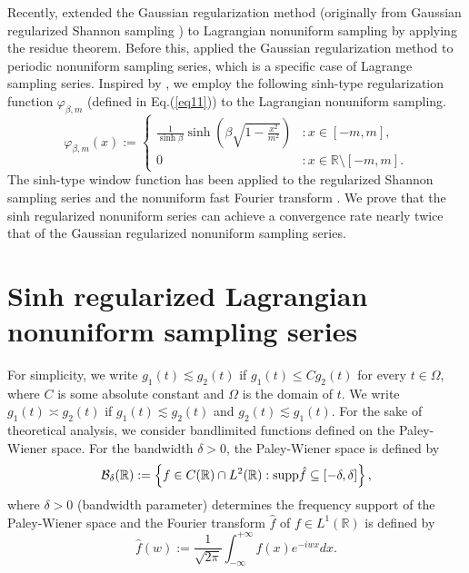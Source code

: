 \documentclass[a4paper]{article}
\numberwithin{equation}{section}
\begin{document}
Recently, \cite{yang2025exponential} extended the Gaussian regularization method (originally from Gaussian regularized Shannon sampling \cite{Wei1998,Wei2000,Qian2003,Tanaka2008,Micchelli2009,Lin2017,chen2019sharp,lin2019optimal,asharabi2022multidimensional,chen2023hyper}) to Lagrangian nonuniform sampling by applying the residue theorem. Before this, \cite{asharabi2023periodic,asharabi2024modification}   applied the Gaussian regularization method to periodic nonuniform sampling series, which is a specific case of Lagrange sampling series. Inspired by \cite{kircheis2024optimal}, we employ the 
following sinh-type regularization function $\varphi_{\beta,m}$ (defined in Eq.(\ref{eq11})) to the Lagrangian nonuniform sampling.
\begin{equation}\label{eq11} 
\varphi_{\beta,m}(x) := 
\begin{cases} 
\frac{1}{\sinh \beta} \sinh \left( \beta \sqrt{1 - \frac{x^2}{m^2}} \right) & : x \in [-m, m], \\ 
0 & : x \in \mathbb{R} \setminus [-m, m].
\end{cases}
\end{equation}
The sinh-type window function has been applied to the regularized Shannon sampling series \cite{Kircheis2022,filbir2023regularized,Kircheis2024} and the nonuniform fast Fourier transform \cite{Plonka2023,kircheis2025nonequispaced}. We prove that  the sinh regularized nonuniform series can achieve a convergence rate nearly twice that of the Gaussian regularized nonuniform sampling series.



\section{Sinh regularized Lagrangian nonuniform sampling series}
For simplicity, we write $ g_1(t)\lesssim g_2(t)$ if $g_1(t)\le C g_2(t)$ for every $t\in \Omega$, where $C$ is some absolute constant and $\Omega$ is the domain of $t$. We write $ g_1(t)\asymp g_2(t)$ if $ g_1(t)\lesssim g_2(t)$ and $ g_2(t)\lesssim g_1(t)$.
For the sake of theoretical analysis, we consider bandlimited functions defined on the Paley-Wiener space. For the bandwidth $\delta>0$, the Paley-Wiener space is defined by 
\[
\mathcal{B}_{\delta}(\mathbb{R}) := \left\{ f \in C(\mathbb{R}) \cap L^2(\mathbb{R}): {\rm supp} \hat{f} \subseteq [-\delta,\delta] \right\},
\]
where $\delta>0$ (bandwidth parameter) determines the frequency support of the Paley-Wiener space  and the Fourier transform $ \hat{f}$ of $f\in L^{1}(\mathbb{R})$  is defined by
$$\hat{f}(w):=\frac{1}{\sqrt{2\pi}}\int_{-\infty }^{ +\infty} f(x) e^{-iwx}dx.$$
\end{document}

